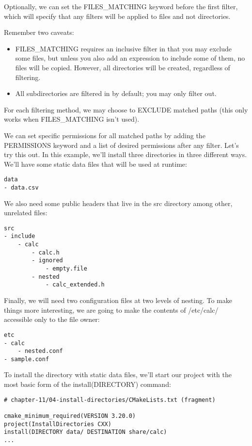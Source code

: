 Optionally, we can set the FILES\_MATCHING keyword before the first filter, which will specify that any filters will be applied to files and not directories.

Remember two caveats:

\begin{itemize}
\item 
FILES\_MATCHING requires an inclusive filter in that you may exclude some files, but unless you also add an expression to include some of them, no files will be copied. However, all directories will be created, regardless of filtering.

\item 
All subdirectories are filtered in by default; you may only filter out.
\end{itemize}

For each filtering method, we may choose to EXCLUDE matched paths (this only works when FILES\_MATCHING isn't used).

We can set specific permissions for all matched paths by adding the PERMISSIONS keyword and a list of desired permissions after any filter. Let's try this out. In this example, we'll install three directories in three different ways. We'll have some static data files that will be used at runtime:

\begin{lstlisting}[style=stylePython]
data
- data.csv
\end{lstlisting}

We also need some public headers that live in the src directory among other, unrelated files:

\begin{lstlisting}[style=stylePython]
src
- include
	- calc
		- calc.h
		- ignored
			- empty.file
		- nested
			- calc_extended.h
\end{lstlisting}

Finally, we will need two configuration files at two levels of nesting. To make things more interesting, we are going to make the contents of /etc/calc/ accessible only to the file owner:

\begin{lstlisting}[style=stylePython]
etc
- calc
	- nested.conf
- sample.conf
\end{lstlisting}

To install the directory with static data files, we'll start our project with the most basic form of the install(DIRECTORY) command:

\begin{lstlisting}[style=styleCMake]
# chapter-11/04-install-directories/CMakeLists.txt (fragment)

cmake_minimum_required(VERSION 3.20.0)
project(InstallDirectories CXX)
install(DIRECTORY data/ DESTINATION share/calc)
...
\end{lstlisting}

